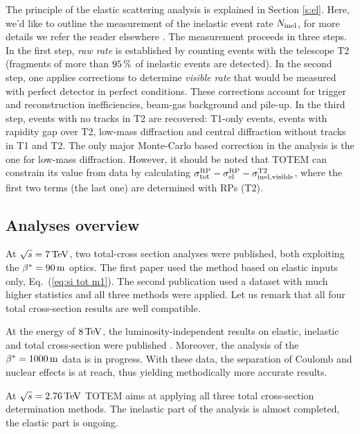 \documentclass{desyproc}
\def\un#1{\,{\rm #1}}
\begin{document}
The principle of the elastic scattering analysis is explained in Section \ref{s:el}. Here, we'd like to outline the measurement of the inelastic event rate $N_{\rm inel}$, for more details we refer the reader elsewhere \cite{si_inel_7,si_tot_8}. The measurement proceeds in three steps. In the first step, {\em raw rate} is established by counting events with the telescope T2 (fragments of more than $95\un{\%}$ of inelastic events are detected). In the second step, one applies corrections to determine {\em visible rate} that would be measured with perfect detector in perfect conditions. These corrections account for trigger and reconstruction inefficiencies, beam-gas background and pile-up. In the third step, events with no tracks in T2 are recovered:  T1-only events, events with rapidity gap over T2, low-mass diffraction and central diffraction without tracks in T1 and T2. The only major Monte-Carlo based correction in the analysis is the one for low-mass diffraction. However, it should be noted that TOTEM can constrain its value from data by calculating $\sigma_{\rm tot}^{\rm RP} - \sigma_{\rm el}^{\rm RP} - \sigma_{\rm inel, visible}^{\rm T2}$, where the first two terms (the last one) are determined with RPs (T2).




\subsection{Analyses overview}

At $\sqrt s =7\un{TeV}$, two total-cross section analyses were published, both exploiting the $\beta^*=90\un{m}$ optics. The first paper \cite{si_el_7_90a} used the method based on elastic inputs only, Eq.~(\ref{eq:si tot m1}). The second publication \cite{si_el_7_90b} used a dataset with much higher statistics and all three methods were applied. Let us remark that all four total cross-section results are well compatible.

At the energy of $8\un{TeV}$, the luminosity-independent results on elastic, inelastic and total cross-section were published \cite{si_tot_8}. Moreover, the analysis of the $\beta^*=1000\un{m}$ data is in progress. With these data, the separation of Coulomb and nuclear effects is at reach, thus yielding methodically more accurate results.

At $\sqrt s = 2.76\un{TeV}$ TOTEM aims at applying all three total cross-section determination methods. The inelastic part of the analysis is almost completed, the elastic part is ongoing.
\end{document}
